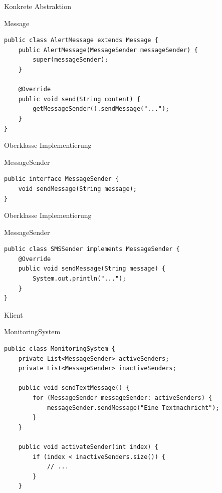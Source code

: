 \begin{frame}[fragile]{Konkrete Abstraktion}
	\begin{exampleblock}{Message}
 		\begin{lstlisting}
public class AlertMessage extends Message {
    public AlertMessage(MessageSender messageSender) {
        super(messageSender);
    }

    @Override
    public void send(String content) {
        getMessageSender().sendMessage("...");
    }
}
 		\end{lstlisting}
 	\end{exampleblock}
\end{frame}

\begin{frame}[fragile]{Oberklasse Implementierung}
	\begin{exampleblock}{MessageSender}
 		\begin{lstlisting}
public interface MessageSender {
    void sendMessage(String message);
}
 		\end{lstlisting}
 	\end{exampleblock}
\end{frame}

\begin{frame}[fragile]{Oberklasse Implementierung}
	\begin{exampleblock}{MessageSender}
 		\begin{lstlisting}
public class SMSSender implements MessageSender {
    @Override
    public void sendMessage(String message) {
        System.out.println("...");
    }
}
 		\end{lstlisting}
 	\end{exampleblock}
\end{frame}

\begin{frame}[fragile]{Klient}
	\begin{exampleblock}{MonitoringSystem}
 		\begin{lstlisting}
public class MonitoringSystem {
	private List<MessageSender> activeSenders;
	private List<MessageSender> inactiveSenders;
	
	public void sendTextMessage() {
		for (MessageSender messageSender: activeSenders) {
			messageSender.sendMessage("Eine Textnachricht");
		}
	}
	
	public void activateSender(int index) {
		if (index < inactiveSenders.size()) {
			// ...
		}
	}
 		\end{lstlisting}
 	\end{exampleblock}
\end{frame}